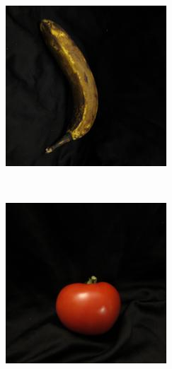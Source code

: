\documentclass[final]{beamer}
\newlength{\onecolwid}
\begin{document}
\begin{frame}[t]
\begin{columns}[t]
\begin{column}{\onecolwid}
\begin{figure}
\begin{subfigure}{.123\textwidth}
\end{subfigure}%
  \begin{subfigure}{.123\textwidth}
  \centering
\includegraphics[width=\textwidth]{0_4.jpg}
\end{subfigure}\,
  \begin{subfigure}{.123\textwidth}
  \centering
\includegraphics[width=\textwidth]{3_1.jpg}

\end{subfigure}
\end{figure}
\end{column}
\end{columns}
\end{frame}
\end{document}
